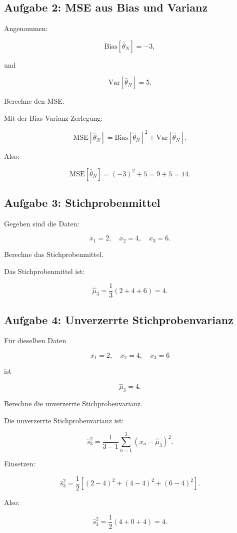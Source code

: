 \subsection{Aufgabe 2: MSE aus Bias und Varianz}

Angenommen:

\[
    \mathrm{Bias}[\hat{\theta}_N]
    =
    -3,
\]

und

\[
    \mathrm{Var}[\hat{\theta}_N]
    =
    5.
\]

Berechne den MSE.

\begin{examplebox}
Mit der Bias-Varianz-Zerlegung:

\[
    \mathrm{MSE}[\hat{\theta}_N]
    =
    \mathrm{Bias}[\hat{\theta}_N]^2
    +
    \mathrm{Var}[\hat{\theta}_N].
\]

Also:

\[
    \mathrm{MSE}[\hat{\theta}_N]
    =
    (-3)^2 + 5
    =
    9+5
    =
    14.
\]
\end{examplebox}

\subsection{Aufgabe 3: Stichprobenmittel}

Gegeben sind die Daten:

\[
    x_1=2,
    \quad
    x_2=4,
    \quad
    x_3=6.
\]

Berechne das Stichprobenmittel.

\begin{examplebox}
Das Stichprobenmittel ist:

\[
    \hat{\mu}_3
    =
    \frac{1}{3}
    (2+4+6)
    =
    4.
\]
\end{examplebox}

\subsection{Aufgabe 4: Unverzerrte Stichprobenvarianz}

Für dieselben Daten

\[
    x_1=2,
    \quad
    x_2=4,
    \quad
    x_3=6
\]

ist

\[
    \hat{\mu}_3 = 4.
\]

Berechne die unverzerrte Stichprobenvarianz.

\begin{examplebox}
Die unverzerrte Stichprobenvarianz ist:

\[
    \hat{s}^2_3
    =
    \frac{1}{3-1}
    \sum_{n=1}^{3}
    (x_n-\hat{\mu}_3)^2.
\]

Einsetzen:

\[
    \hat{s}^2_3
    =
    \frac{1}{2}
    \left[
        (2-4)^2
        +
        (4-4)^2
        +
        (6-4)^2
    \right].
\]

Also:

\[
    \hat{s}^2_3
    =
    \frac{1}{2}
    (4+0+4)
    =
    4.
\]
\end{examplebox}

